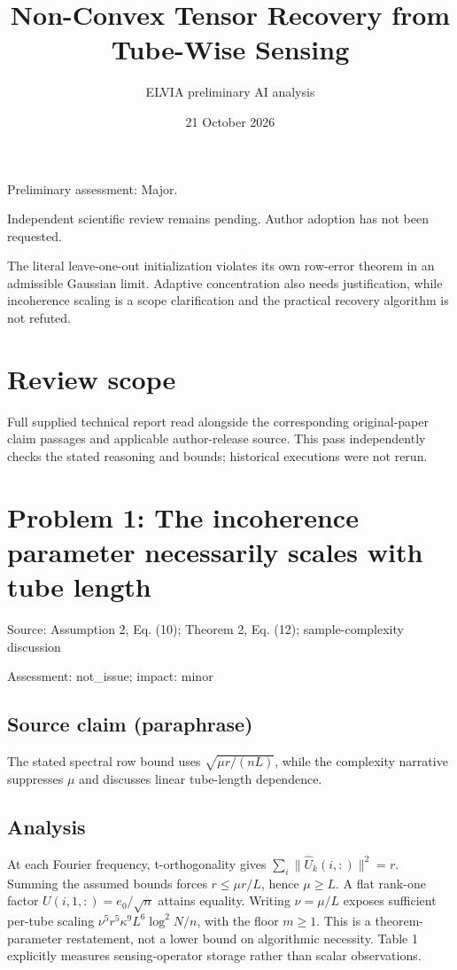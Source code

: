 \documentclass[11pt]{article}
\begin{document}
\title{Non-Convex Tensor Recovery from Tube-Wise Sensing}

\author{ELVIA preliminary AI analysis}\date{21 October 2026}\maketitle

Preliminary assessment: Major.\par

Independent scientific review remains pending. Author adoption has not been requested.

The literal leave-one-out initialization violates its own row-error theorem in an admissible Gaussian limit. Adaptive concentration also needs justification, while incoherence scaling is a scope clarification and the practical recovery algorithm is not refuted.

\section*{Review scope}

Full supplied technical report read alongside the corresponding original-paper claim passages and applicable author-release source. This pass independently checks the stated reasoning and bounds; historical executions were not rerun.

\section*{Problem 1: The incoherence parameter necessarily scales with tube length}

Source: Assumption 2, Eq. (10); Theorem 2, Eq. (12); sample-complexity discussion

Assessment: not\_issue; impact: minor

\subsection*{Source claim (paraphrase)}

The stated spectral row bound uses \(\sqrt{\mu r/(nL)}\), while the complexity narrative suppresses \(\mu\) and discusses linear tube-length dependence.

\subsection*{Analysis}

At each Fourier frequency, t-orthogonality gives \(\sum_i\|\widehat U_k(i,:)\|^2=r\). Summing the assumed bounds forces \(r\le\mu r/L\), hence \(\mu\ge L\). A flat rank-one factor \(U(i,1,:)=e_0/\sqrt n\) attains equality. Writing \(\nu=\mu/L\) exposes sufficient per-tube scaling \(\nu^5r^5\kappa^9L^6\log^2N/n\), with the floor \(m\ge1\). This is a theorem-parameter restatement, not a lower bound on algorithmic necessity. Table 1 explicitly measures sensing-operator storage rather than scalar observations.
\end{document}
